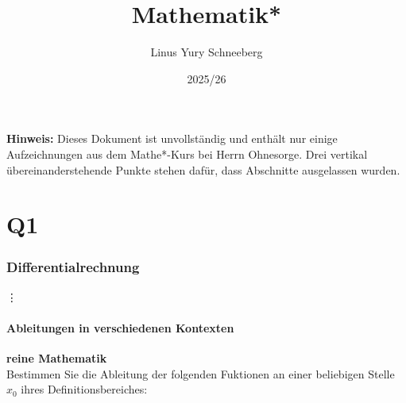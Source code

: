\documentclass{article}
\title{Mathematik*}
\author{Linus Yury Schneeberg}
\date{2025/26}
\begin{document}
	\maketitle
	\tableofcontents
	
	\vspace*{\fill}
	\textbf{Hinweis: }Dieses Dokument ist unvollständig und enthält nur einige Aufzeichnungen aus dem Mathe*-Kurs bei Herrn Ohnesorge. Drei vertikal übereinanderstehende Punkte stehen dafür, dass Abschnitte ausgelassen wurden.
	\newpage
	
	
	\part{Q1}
	\section{Differentialrechnung}
	\vdots
	\subsection{Ableitungen in verschiedenen Kontexten}
	\textbf{reine Mathematik} \\
	Bestimmen Sie die Ableitung der folgenden Fuktionen an einer beliebigen Stelle \(x_0\) ihres Definitionsbereiches:
	
\end{document}
